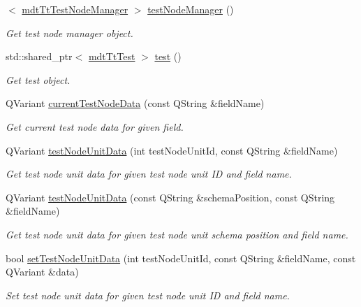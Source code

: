 \begin{DoxyCompactItemize}
$<$ \hyperlink{classmdt_tt_test_node_manager}{mdt\-Tt\-Test\-Node\-Manager} $>$ \hyperlink{classmdt_tt_abstract_test_node_calibration_tool_aeba30ff3f083a8a3c65dce704b132ba7}{test\-Node\-Manager} ()
\begin{DoxyCompactList}\small\item\em Get test node manager object. \end{DoxyCompactList}\item 
std\-::shared\-\_\-ptr$<$ \hyperlink{classmdt_tt_test}{mdt\-Tt\-Test} $>$ \hyperlink{classmdt_tt_abstract_test_node_calibration_tool_ab3db9df8cd757adca0dabf085a31374e}{test} ()
\begin{DoxyCompactList}\small\item\em Get test object. \end{DoxyCompactList}\item 
Q\-Variant \hyperlink{classmdt_tt_abstract_test_node_calibration_tool_a42d8aaef4d70f5afe2eca46f3d1ed32b}{current\-Test\-Node\-Data} (const Q\-String \&field\-Name)
\begin{DoxyCompactList}\small\item\em Get current test node data for given field. \end{DoxyCompactList}\item 
Q\-Variant \hyperlink{classmdt_tt_abstract_test_node_calibration_tool_ab9303ff1fa75268af20c920e5c14ef8a}{test\-Node\-Unit\-Data} (int test\-Node\-Unit\-Id, const Q\-String \&field\-Name)
\begin{DoxyCompactList}\small\item\em Get test node unit data for given test node unit I\-D and field name. \end{DoxyCompactList}\item 
Q\-Variant \hyperlink{classmdt_tt_abstract_test_node_calibration_tool_a56ea21dd9edf2abb6be1c4bf872f13c0}{test\-Node\-Unit\-Data} (const Q\-String \&schema\-Position, const Q\-String \&field\-Name)
\begin{DoxyCompactList}\small\item\em Get test node unit data for given test node unit schema position and field name. \end{DoxyCompactList}\item 
bool \hyperlink{classmdt_tt_abstract_test_node_calibration_tool_a0e1be9284aaa5ac0ac836d3b81db0616}{set\-Test\-Node\-Unit\-Data} (int test\-Node\-Unit\-Id, const Q\-String \&field\-Name, const Q\-Variant \&data)
\begin{DoxyCompactList}\small\item\em Set test node unit data for given test node unit I\-D and field name. \end{DoxyCompactList}\item 

\end{DoxyCompactItemize}
